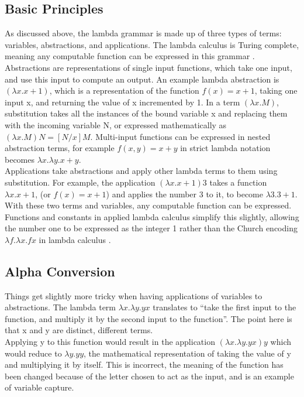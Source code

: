 \documentclass[a4paper,12pt]{report}
\begin{document}
\subsection{Basic Principles}

As discussed above, the lambda grammar is made up of three types of terms: variables, abstractions, and applications. The lambda calculus is Turing complete, meaning any computable function can be expressed in this grammar \cite{Rojas1998}.\\

Abstractions are representations of single input functions, which take one input, and use this input to compute an output. An example lambda abstraction is $(\lambda x.x+1)$, which is a representation of the function $f(x) = x+1$, taking one input x, and returning the value of x incremented by 1. In a term $(\lambda x.M)$, substitution takes all the instances of the bound variable x and replacing them with the incoming variable N, or expressed mathematically as $(\lambda x.M)N=[N / x]M$. Multi-input functions can be expressed in nested abstraction terms, for example $f(x,y)=x+y$ in strict lambda notation becomes $\lambda x.\lambda y.x+y$.\\

Applications take abstractions and apply other lambda terms to them using substitution. For example, the application $(\lambda x.x+1)3$ takes a function $\lambda x.x+1$, (or $f(x)=x+1$) and applies the number 3 to it, to become $\lambda3.3+1$.\\

With these two terms and variables, any computable function can be expressed. Functions and constants in applied lambda calculus simplify this slightly, allowing the number one to be expressed as the integer 1 rather than the Church encoding $\lambda f.\lambda x.fx$ in lambda calculus \cite{Tarau2017}.

\subsection{Alpha Conversion}

Things get slightly more tricky when having applications of variables to abstractions. The lambda term $\lambda x.\lambda y.yx$ translates to “take the first input to the function, and multiply it by the second input to the function”. The point here is that x and y are distinct, different terms.\\

Applying y to this function would result in the application $(\lambda x.\lambda y.yx)y$ which would reduce to $\lambda y.yy$, the mathematical representation of taking the value of y and multiplying it by itself. This is incorrect, the meaning of the function has been changed because of the letter chosen to act as the input, and is an example of variable capture.\\
\end{document}
